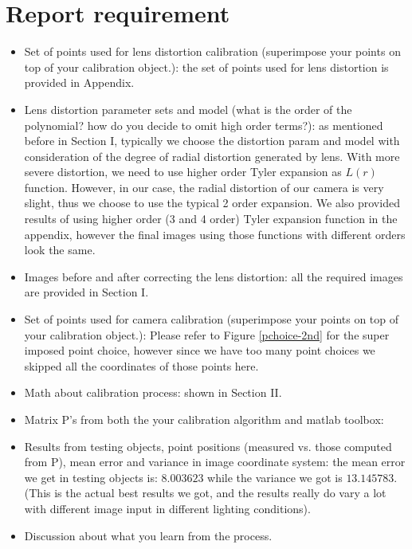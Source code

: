 \documentclass[conference]{IEEEtran}
\begin{document}
\section{Report requirement}
\begin{itemize}
	\item Set of points used for lens distortion calibration (superimpose your points on top of your calibration object.): the set of points used for lens distortion is provided in Appendix.
	\item Lens distortion parameter sets and model (what is the order of the polynomial? how do you decide to omit high order terms?): as mentioned before in Section I, typically we choose the distortion param and model with consideration of the degree of radial distortion generated by lens. With more severe distortion, we need to use higher order Tyler expansion as $L(r)$ function. However, in our case, the radial distortion of our camera is very slight, thus we choose to use the typical 2 order expansion. We also provided results of using higher order (3 and 4 order) Tyler expansion function in the appendix, however the final images using those functions with different orders look the same.
	\item Images before and after correcting the lens distortion: all the required images are provided in Section I.
	\item Set of points used for camera calibration (superimpose your points on top of your calibration object.): Please refer to Figure \ref{pchoice-2nd} for the super imposed point choice, however since we have too many point choices we skipped all the coordinates of those points here.
	\item Math about calibration process: shown in Section II.
	\item Matrix P's from both the your calibration algorithm and matlab toolbox: 
	\item Results from testing objects, point positions (measured vs. those computed from P), mean error and variance in image coordinate system: the mean error we get in testing objects is: $8.003623$ while the variance we got is $13.145783$. (This is the actual best results we got, and the results really do vary a lot with different image input in different lighting conditions).
	\item Discussion about what you learn from the process.
\end{itemize}
\end{document}
